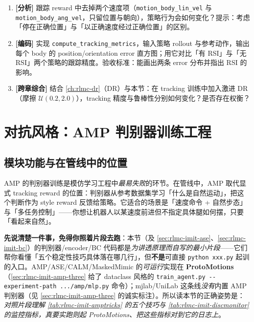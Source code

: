 \begin{practice}[练习·显式跟踪]
\begin{enumerate}
  \item \textbf{[分析]} 跟踪 reward 中去掉两个速度项（\verb|motion_body_lin_vel| 与 \verb|motion_body_ang_vel|，只留位置与朝向），策略行为会如何变化？提示：考虑「停在正确位置」与「以正确速度经过正确位置」的区别。
  \item \textbf{[编码]} 实现 \verb|compute_tracking_metrics|，输入策略 rollout 与参考动作，输出每个 body 的 position/orientation error 直方图；用它对比「有 RSI」与「无 RSI」两个策略的跟踪精度。验收标准：能画出两条 error 分布并指出 RSI 的影响。
  \item \textbf{[跨章综合]} 结合 \cref{ch:rlmc-dr}（DR）与本节：在 tracking 训练中加入激进 DR（摩擦 $\mathcal{U}(0.2,2.0)$），tracking 精度与鲁棒性分别如何变化？是否存在权衡？
\end{enumerate}
\end{practice}

\section{对抗风格：AMP 判别器训练工程}
\label{sec:rlmc-imit-amp}

\subsection{模块功能与在管线中的位置}
\label{sec:rlmc-imit-amp-pos}

AMP 的判别器训练是模仿学习工程中\emph{最易失败}的环节。在管线中，AMP 取代显式 tracking reward 的位置：判别器从参考数据集学习「什么是自然运动」，把这个判断作为 style reward 反馈给策略。它适合的场景是「速度命令 + 自然步态」与「多任务控制」——你想让机器人以某速度前进但不指定具体腿如何摆，只要「看起来自然」。

\begin{note}
\textbf{先说清楚一件事，免得你照着片段去跑}：本节（及 \cref{sec:rlmc-imit-ase}、\cref{sec:rlmc-imit-bc}）的判别器/encoder/BC 代码都是\emph{为讲透原理而自写的最小片段}——它们帮你看懂「五个稳定性技巧具体落在哪几行」，但\textbf{不是}可直接 \verb|python xxx.py| 起训的入口。AMP/ASE/CALM/MaskedMimic 的\emph{可运行}实现在 \textbf{ProtoMotions}（\cref{sec:rlmc-imit-amp-three} 给了 dataclass 风格的 \verb|train_agent.py --experiment-path .../amp/mlp.py| 命令）；mjlab/UniLab 这条线\emph{没有}内置 AMP 判别器（见 \cref{sec:rlmc-imit-amp-three} 的诚实标注）。所以读本节的正确姿势是：\emph{对照片段理解 \cref{tab:rlmc-imit-amptricks} 的五个技巧与 \cref{tab:rlmc-imit-discmonitor} 的监控指标，真要实跑则起 ProtoMotions、把这些指标对到它的日志上}。
\end{note}

